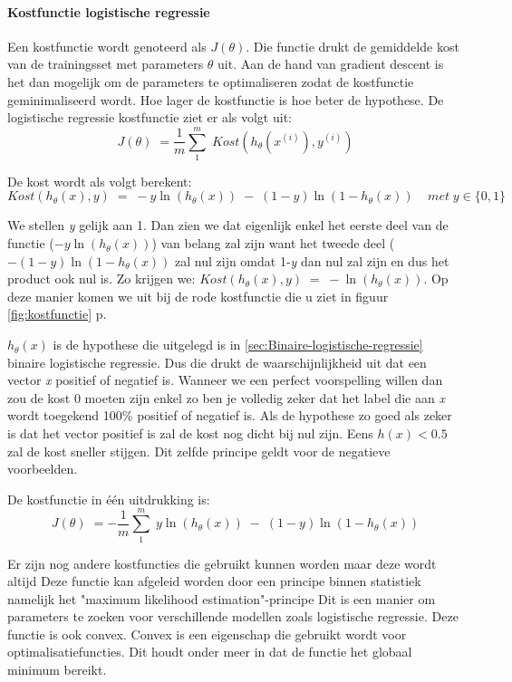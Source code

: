 \paragraph{Kostfunctie logistische regressie}
\label{par:kostfunctie-log}
Een kostfunctie wordt genoteerd als $J(\theta)$. Die functie drukt de gemiddelde kost van de trainingsset met parameters $\theta$ uit. Aan de hand van gradient descent is het dan mogelijk om de parameters te optimaliseren zodat de kostfunctie geminimaliseerd wordt. Hoe lager de kostfunctie is hoe beter de hypothese.
De logistische regressie kostfunctie ziet er als volgt uit: 
$$ 
J(\theta) \; = \frac{1}{m}\sum_{1}^{m} \;   Kost (h_{\theta}(x^{(i)}), y^{(i)} )  
$$

De kost wordt als volgt berekent:
$$Kost (h_{\theta}(x), y) \; = \; -y\ln(h_{\theta}(x)) \;- \;(1-y) \ln(1-h_{\theta}(x))  \;\;\;\; met \; y \in \{0,1\}$$

We stellen \textit{y} gelijk aan 1. Dan zien we dat eigenlijk enkel het eerste deel van de functie ($-y\ln(h_{\theta}(x))$) van belang zal zijn want het tweede deel ($- (1-y) \ln(1-h_{\theta}(x))$ zal nul zijn omdat 1-\textit{y} dan nul zal zijn en dus het product ook nul is. Zo krijgen we: 
\newline $Kost (h_{\theta}(x), y) \; = \; -\ln(h_{\theta}(x))$. Op deze manier komen we uit bij de rode kostfunctie die u ziet in figuur \ref{fig:kostfunctie} p\pageref{fig:kostfunctie}.

$h_{\theta}(x)$ is de hypothese die uitgelegd is in \ref{sec:Binaire-logistische-regressie} binaire logistische regressie. Dus die drukt de waarschijnlijkheid uit dat een vector \textit{x} positief of negatief is. Wanneer we een perfect voorspelling willen dan zou de kost 0 moeten zijn enkel zo ben je volledig zeker dat het label die aan \textit{x} wordt toegekend 100\% positief of negatief is. Als de hypothese zo goed als zeker is dat het vector positief is zal de kost nog dicht bij nul zijn. Eens $h(x) < 0.5$ zal de kost sneller stijgen. Dit zelfde principe geldt voor de negatieve voorbeelden. 

De kostfunctie in één uitdrukking is: 
$$ 
J(\theta) \; = -\frac{1}{m}\sum_{1}^{m} \;  y\ln(h_{\theta}(x)) \;- \;(1-y) \ln(1-h_{\theta}(x))  
$$

Er zijn nog andere kostfuncties die gebruikt kunnen worden maar deze wordt altijd 
Deze functie kan afgeleid worden door een principe binnen statistiek namelijk het "maximum likelihood estimation"-principe Dit is een manier om parameters te zoeken voor verschillende modellen zoals logistische regressie. Deze functie is ook convex. Convex is een eigenschap die gebruikt wordt voor optimalisatiefuncties. Dit houdt onder meer in dat de functie het globaal minimum bereikt. 

